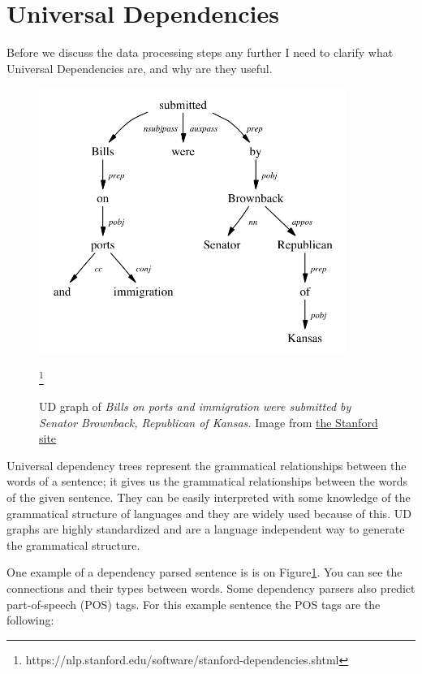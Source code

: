 \section{Universal Dependencies}
Before we discuss the data processing steps any further I need to clarify what Universal Dependencies are, and why are they useful.

\begin{figure}[!ht]
	\centering
	\includegraphics[width=100mm, keepaspectratio]{figures/UD.png}
	\caption{UD graph of \textit{Bills on ports and immigration were submitted by Senator Brownback, Republican of Kansas.} Image from \href{https://nlp.stanford.edu/software/stanford-dependencies.shtml}{the Stanford site}}\footnote{https://nlp.stanford.edu/software/stanford-dependencies.shtml}
	\label{fig:UD}
\end{figure}

Universal dependency trees represent the grammatical relationships between the words of a sentence; it gives us the grammatical relationships between the words of the given sentence. They can be easily interpreted with some knowledge of the grammatical structure of languages and they are widely used because of this. UD graphs are highly standardized and are a language independent way to generate the grammatical structure.

One example of a dependency parsed sentence is is on Figure\ref{fig:UD}. You can see the connections and their types between words. Some dependency parsers also predict part-of-speech (POS) tags. For this example sentence the POS tags are the following:

